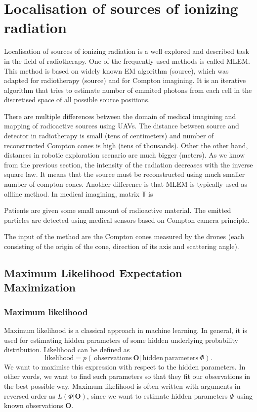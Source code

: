 \section{Localisation of sources of ionizing radiation}

Localisation of sources of ionizing radiation is a well explored and described task in the field of radiotherapy.
One of the frequently used methods is called \ac{MLEM}.
This method is based on widely known EM algorithm (source), which was adapted for radiotherapy (source) and for Compton imagining.
It is an iterative algorithm that tries to estimate number of emmited photons from each cell in the discretised space of all possible source positions.





There are multiple differences between the domain of medical imagining and mapping of radioactive sources using \ac{UAV}s.
The distance between source and detector in radiotherapy is small (tens of centimeters) and number of reconstructed Compton cones is high (tens of thousands).
Other the other hand, distances in robotic exploration scenario are much bigger (meters). 
As we know from the previous section, the intensity of the radiation decreases with the inverse square law.
It means that the source must be reconstructed using much smaller number of compton cones.
Another difference is that \ac{MLEM} is typically used as offline method.
In medical imagining, matrix $\mathbb{T}$ is 




Patients are given some small amount of radioactive material.
The emitted particles are detected using medical sensors based on Compton camera principle.

The input of the method are the Compton cones measured by the drones (each consisting of the origin of the cone, direction of its axis and scattering angle). 

\subsection{Maximum Likelihood Expectation Maximization}

\subsubsection{Maximum likelihood}
Maximum likelihood is a classical approach in machine learning.
In general, it is used for estimating hidden parameters of some hidden underlying probability distribution.
Likelihood can be defined as 
\begin{equation}
  \mathrm{likelihood} = p(\ \mathrm{observations } \  \boldsymbol{O} | \ \mathrm{hidden \ parameters\ } \Phi ).
  \label{eq:likelihood}
\end{equation}
We want to maximise this expression with respect to the hidden parameters.
In other words, we want to find such parameters so that they fit our observations in the best possible way.
Maximum likelihood is often written with arguments in reversed order as $L(\Phi | \boldsymbol{O} )$, since we want to estimate hidden parameters $\Phi$ using known observations $\boldsymbol{O}$.



